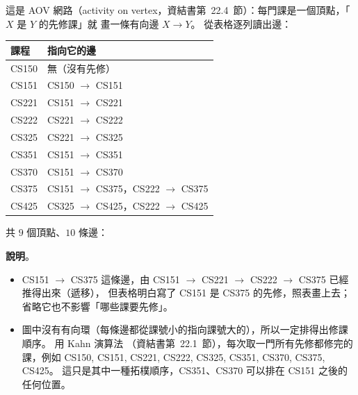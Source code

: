 \begin{pastsoln}
這是 AOV 網路（activity on vertex，資結書第~22.4~節）：每門課是一個頂點，「$X$ 是 $Y$ 的先修課」就
畫一條有向邊 $X \to Y$。 從表格逐列讀出邊：
\begin{center}
\begin{tabular}{ll}
\toprule
課程 & 指向它的邊 \\
\midrule
CS150 & 無（沒有先修） \\
CS151 & CS150 $\to$ CS151 \\
CS221 & CS151 $\to$ CS221 \\
CS222 & CS221 $\to$ CS222 \\
CS325 & CS221 $\to$ CS325 \\
CS351 & CS151 $\to$ CS351 \\
CS370 & CS151 $\to$ CS370 \\
CS375 & CS151 $\to$ CS375，CS222 $\to$ CS375 \\
CS425 & CS325 $\to$ CS425，CS222 $\to$ CS425 \\
\bottomrule
\end{tabular}
\end{center}
共 $9$ 個頂點、$10$ 條邊：

\begin{center}
\end{center}

\textbf{說明}。
\begin{itemize}
\item CS151 $\to$ CS375 這條邊，由 CS151 $\to$ CS221 $\to$ CS222 $\to$ CS375 已經推得出來（遞移），
但表格明白寫了 CS151 是 CS375 的先修，照表畫上去；省略它也不影響「哪些課要先修」。
\item 圖中沒有有向環（每條邊都從課號小的指向課號大的），所以一定排得出修課順序。 用 Kahn 演算法
（資結書第~22.1~節），每次取一門所有先修都修完的課，例如
CS150, CS151, CS221, CS222, CS325, CS351, CS370, CS375, CS425。
這只是其中一種拓樸順序，CS351、CS370 可以排在 CS151 之後的任何位置。
\end{itemize}
\end{pastsoln}
